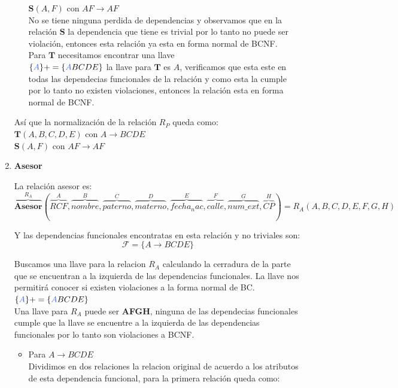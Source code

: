 \documentclass[10pt]{article}
\begin{document}
\begin{enumerate}
\begin{itemize}
    	$\textbf{S}(A,F)$ con $AF \rightarrow AF$\\ 
    	
    	No se tiene ninguna perdida de dependencias y observamos que en la relación
    	$\textbf{S}$ la dependencia que tiene es trivial por lo tanto no puede ser violación, entonces esta relación ya esta en forma normal de BCNF. \\
    	Para $\textbf{T}$  necesitamos encontrar una llave\\
    	$\{\textcolor{RoyalBlue}{A}\}+= \{\textcolor{RoyalBlue}{A}BCDE\}$ la llave para $\textbf{T}$ es $A$, verificamos que esta este en todas las dependecias funcionales de la relación y como esta la cumple por lo tanto no existen violaciones, entonces la relación esta en forma normal de BCNF.\\
    \end{itemize}
    Así que la normalización de la relación $R_P$ queda como:\\
    
    	$\textbf{T}(A,B,C,D,E)$ con $A \rightarrow BCDE$\\   
    $\textbf{S}(A,F)$ con $AF \rightarrow AF$\\
   
   
   
   \item \textbf{Asesor}
   
   La relación asesor es:
   \[\overbrace{{\textbf{Asesor}}}^{\textbf{$R_{A}$}} 
   (
   \overbrace{RCF}^{A},
   \overbrace{nombre}^{B}, \overbrace{paterno}^{C}, \overbrace{materno}^{D}, \overbrace{fecha_nac}^{E}, \overbrace{calle}^{F}, \overbrace{num\_ext}^{G}, \overbrace{CP}^{H}
   )
   = 
   \textbf{$R_A$}(A,B,C,D,E,F,G,H)
   \]
   
   Y las dependencias funcionales encontratas en esta relación  y no triviales son:\\
   \[\mathcal{F} = \{A \rightarrow BCDE\}\]
   
   Buscamos una llave para la relacion $R_A$ calculando la cerradura de la parte que se encuentran a la izquierda de las dependencias funcionales. La llave nos permitirá conocer si existen violaciones a la forma normal de BC.\\
   
   $\{\textcolor{RoyalBlue}{A}\}+= \{\textcolor{RoyalBlue}{A}BCDE\}$\\
   
  Una llave para $R_A$ puede ser \textbf{AFGH}, ninguna de las dependecias funcionales cumple que la llave se encuentre a la izquierda de las dependencias funcionales por lo tanto son violaciones a BCNF.\\
   \begin{itemize}
   	\item Para $A \rightarrow BCDE$\\
   	Dividimos en dos relaciones la relacion original de acuerdo a los atributos de esta dependencia funcional, para la primera relación queda como:\\
   	

\end{itemize}
\end{enumerate}
\end{document}
